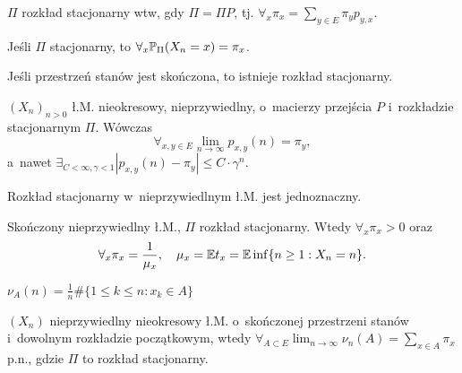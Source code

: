 



	\begin{fact}
		$\Pi$ rozkład stacjonarny wtw, gdy $\Pi = \Pi P$,
		tj. $\forall_x \pi_x = \sum_{y \in E} \pi_y p_{y,x}$.
	\end{fact}
	
	\begin{remark}
		Jeśli $\Pi$ stacjonarny, to $\forall_x \P_\Pi(X_n = x) = \pi_x$.
	\end{remark}
	
	\begin{theorem}
		Jeśli przestrzeń stanów jest skończona, to istnieje rozkład
		stacjonarny.
	\end{theorem}
	
	\begin{theorem}
		$(X_n)_{n>0}$ ł.M. nieokresowy, nieprzywiedlny, 
		o~macierzy przejścia $P$ i~rozkładzie stacjonarnym $\Pi$.
		Wówczas $$\forall_{x, y \in E} 
		\lim_{n \to \infty} p_{x,y}(n) = \pi_y,$$
		a~nawet $\displaystyle \exists_{C<\infty, \gamma<1}
		|p_{x,y}(n) - \pi_y| \leq C \cdot \gamma^n$.
	\end{theorem}
	
	\begin{theorem}
		Rozkład stacjonarny w~nieprzywiedlnym ł.M. jest jednoznaczny.
	\end{theorem}
	
	\begin{proposition}
		Skończony nieprzywiedlny ł.M., $\Pi$ rozkład stacjonarny.
		Wtedy
		$\forall_x \pi_x > 0$ oraz $$\forall_x \pi_x = \frac1{\mu_x},
		\quad \mu_x = \E t_x = \E \inf \{ n \geq 1: X_n = n\}.$$
	\end{proposition}
	
	\begin{definition}
		$\displaystyle \nu_A(n) = 
			\frac1n \#\{1 \leq k \leq n : x_k \in A\}$
	\end{definition}
	
	\begin{theorem}
		$(X_n)$ nieprzywiedlny nieokresowy ł.M. o~skończonej 
		przestrzeni stanów i~dowolnym rozkładzie
		początkowym, wtedy
		$\forall_{A \subset E} 
		\lim_{n \to \infty} \nu_n(A) = \sum_{x \in A} \pi_x$ p.n.,
		gdzie $\Pi$ to rozkład stacjonarny.
	\end{theorem}
	

